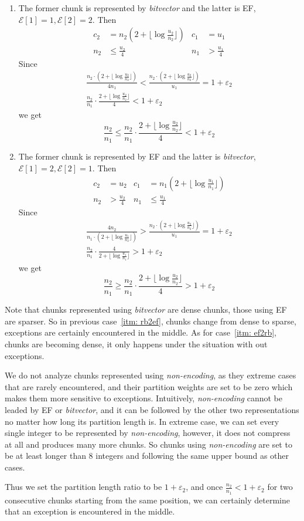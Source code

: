 \documentclass[runningheads,a4paper]{llncs}
\begin{document}
\begin{enumerate}
\item \label{itm: rb2ef}
The former chunk is represented by \textit{bitvector} and the latter is EF,$ \mathcal{E}[1]= 1, \mathcal{E}[2]=2 $. Then
\begin{align*}
c_2 & = n_2(2+\lfloor \log \frac{u_2}{n_2} \rfloor) & c_1 & = u_1 \\ 
n_2 & \leq \frac{u_2}{4} &	n_1 & > \frac{u_1}{4}
\end{align*}
Since
\begin{gather*}
\frac{n_2 \cdot (2+\lfloor \log \frac{u_2}{n_2} \rfloor)}{4 n_1} < \frac{n_2 \cdot (2+\lfloor \log \frac{u_2}{n_2} \rfloor)}{u_1} = 1 + \varepsilon_2 \\
\frac{n_2}{n_1} \cdot \frac{2+\lfloor \log \frac{u_2}{n_2} \rfloor}{4} < 1 + \varepsilon_2
\end{gather*}
we get
\[
	\frac{n_2}{n_1} \leq \frac{n_2}{n_1} \cdot \frac{2+\lfloor \log \frac{u_2}{n_2} \rfloor}{4} < 1 + \varepsilon_2
\]

\item \label{itm: ef2rb}
The former chunk is represented by EF and the latter is \textit{bitvector},$ \mathcal{E}[1]= 2, \mathcal{E}[2]=1 $. Then
\begin{align*}
c_2 & = u_2 & c_1 & = n_1(2+\lfloor \log \frac{u_1}{n_1} \rfloor)\\ 
n_2 & > \frac{u_2}{4} & n_1 & \leq \frac{u_1}{4}
\end{align*}
Since
\begin{gather*}
\frac{4 n_2}{n_1 \cdot (2+\lfloor \log \frac{u_1}{n_2} \rfloor)} > \frac{n_2 \cdot (2+\lfloor \log \frac{u_2}{n_2} \rfloor)}{u_1} = 1 + \varepsilon_2 \\
\frac{n_2}{n_1} \cdot \frac{4}{2+\lfloor \log \frac{u_1}{n_1} \rfloor} > 1 + \varepsilon_2
\end{gather*}
we get
\[
\frac{n_2}{n_1} \geq \frac{n_2}{n_1} \cdot \frac{2+\lfloor \log \frac{u_2}{n_2} \rfloor}{4} > 1 + \varepsilon_2
\]
\end{enumerate}

Note that chunks represented using \textit{bitvector} are dense chunks, those using EF are sparser.
So in previous case~\ref{itm: rb2ef}, chunks change from dense to sparse, exceptions are certainly encountered in the middle.
As for case~\ref{itm: ef2rb}, chunks are becoming dense, it only happens under the situation with out exceptions.

We do not analyze chunks represented using \textit{non-encoding}, as they extreme cases that are rarely encountered, and their partition weights are set to be zero which makes them more sensitive to exceptions.
Intuitively, \textit{non-encoding} cannot be leaded by EF or \textit{bitvector}, and it can be followed by the other two representations no matter how long its partition length is.
In extreme case, we can set every single integer to be represented by \textit{non-encoding}, however, it does not compress at all and produces many more chunks. So chunks using \textit{non-encoding} are set to be at least longer than 8 integers and following the same upper bound as other cases.

Thus we set the partition length ratio to be $ 1+\varepsilon_2 $, and once $ \frac{n_2}{n_1} < 1+ \varepsilon_2 $ for two consecutive chunks starting from the same position, we can certainly determine that an exception is encountered in the middle.  
\end{document}
